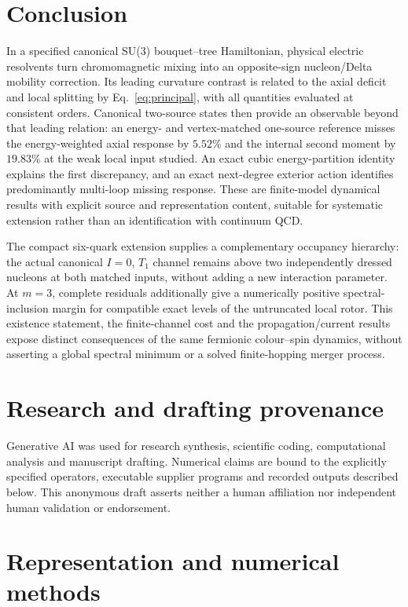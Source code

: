 \documentclass[11pt]{article}
\begin{document}
\section{Conclusion}
In a specified canonical SU(3) bouquet--tree Hamiltonian, physical electric resolvents turn chromomagnetic mixing into an opposite-sign nucleon/Delta mobility correction. Its leading curvature contrast is related to the axial deficit and local splitting by Eq.~\eqref{eq:principal}, with all quantities evaluated at consistent orders. Canonical two-source states then provide an observable beyond that leading relation: an energy- and vertex-matched one-source reference misses the energy-weighted axial response by $5.52\%$ and the internal second moment by $19.83\%$ at the weak local input studied. An exact cubic energy-partition identity explains the first discrepancy, and an exact next-degree exterior action identifies predominantly multi-loop missing response. These are finite-model dynamical results with explicit source and representation content, suitable for systematic extension rather than an identification with continuum QCD.

The compact six-quark extension supplies a complementary occupancy hierarchy: the actual canonical $I=0$, $T_1$ channel remains above two independently dressed nucleons at both matched inputs, without adding a new interaction parameter. At $m=3$, complete residuals additionally give a numerically positive spectral-inclusion margin for compatible exact levels of the untruncated local rotor. This existence statement, the finite-channel cost and the propagation/current results expose distinct consequences of the same fermionic colour--spin dynamics, without asserting a global spectral minimum or a solved finite-hopping merger process.

\section*{Research and drafting provenance}
Generative AI was used for research synthesis, scientific coding, computational analysis and manuscript drafting. Numerical claims are bound to the explicitly specified operators, executable supplier programs and recorded outputs described below. This anonymous draft asserts neither a human affiliation nor independent human validation or endorsement.

\appendix
\section{Representation and numerical methods}
\end{document}
